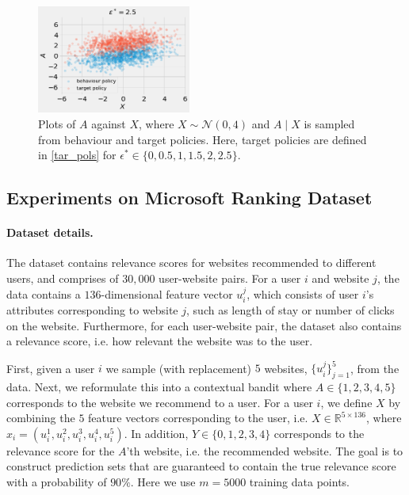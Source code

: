 \begin{figure}[t]
    \includegraphics[width=0.45\textwidth, height=0.3\textwidth]{figures/copp/pol2.5.png}
    \caption{Plots of $A$ against $X$, where $X \sim \mathcal{N}(0, 4)$ and $A\mid X$ is sampled from behaviour and target policies. Here, target policies are defined in \eqref{tar_pols} for $\epsilon^* \in \{0, 0.5, 1, 1.5, 2, 2.5\}$.}
    \label{fig:pols_cts_acs}
\end{figure}


\newpage



\subsection{Experiments on Microsoft Ranking Dataset}\label{sec:MSR_experiments_decrip}

\paragraph{Dataset details.}
The dataset contains relevance scores for websites recommended to different users, and comprises of $30,000$ user-website pairs. For a user $i$ and website $j$, the data contains a $136$-dimensional feature vector $u_i^j$, which consists of user $i$'s attributes corresponding to website $j$, such as length of stay or number of clicks on the website. Furthermore, for each user-website pair, the dataset also contains a relevance score, i.e. how relevant the website was to the user.

First, given a user $i$ we sample (with replacement) $5$ websites,  $\{u_i^j\}_{j=1}^5$, from the data. Next, we reformulate this into a contextual bandit where $A \in \{1,2,3,4,5\}$ corresponds to the website we recommend to a user. For a user $i$, we define $X$ by combining the $5$ feature vectors corresponding to the user, i.e. $X \in \mathbb{R}^{5 \times 136}$, where $x_i = (u^1_{i},u^2_{i},u^3_{i},u^4_{i}, u^5_{i})$. In addition, $Y \in\{0,1,2,3,4\}$ corresponds to the relevance score for the $A$'th website, i.e. the recommended website. The goal is to construct prediction sets that are guaranteed to contain the true relevance score with a probability of $90\%$. Here we use $m=5000$ training data points.

